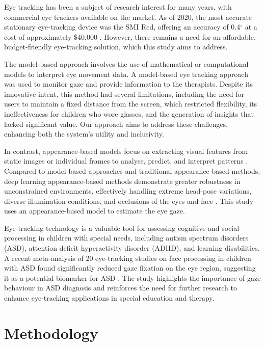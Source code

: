\documentclass[10pt,a4paper,twoside]{article}
\begin{document}
Eye tracking has been a subject of research interest for many years, with commercial eye trackers available on the market. As of 2020, the most accurate stationary eye-tracking device was the SMI Red, offering an accuracy of 0.4$^{\circ}$ at a cost of approximately \$40,000 \cite{rakhmatulin2020}. However, there remains a need for an affordable, budget-friendly eye-tracking solution, which this study aims to address.

The model-based approach \cite{Wang2015} involves the use of mathematical or computational models to interpret eye movement data. A model-based eye tracking approach \cite{Varghese2023} was used to monitor gaze and provide information to the therapists. Despite its innovative intent, this method had several limitations, including the need for users to maintain a fixed distance from the screen, which restricted flexibility, its ineffectiveness for children who wore glasses, and the generation of insights that lacked significant value. Our approach aims to address these challenges, enhancing both the system's utility and inclusivity.

In contrast, appearance-based models focus on extracting visual features from static images or individual frames to analyse, predict, and interpret patterns \cite{1182180}. Compared to model-based approaches and traditional appearance-based methods, deep learning appearance-based methods demonstrate greater robustness in unconstrained environments, effectively handling extreme head-pose variations, diverse illumination conditions, and occlusions of the eyes and face \cite{Pathirana2022}. This study uses an appearance-based model to estimate the eye gaze.

Eye-tracking technology is a valuable tool for assessing cognitive and social processing in children with special needs, including autism spectrum disorders (ASD), attention deficit hyperactivity disorder (ADHD), and learning disabilities. A recent meta-analysis of 20 eye-tracking studies on face processing in children with ASD found significantly reduced gaze fixation on the eye region, suggesting it as a potential biomarker for ASD \cite{Papagiannopoulou2014}. The study highlights the importance of gaze behaviour in ASD diagnosis and reinforces the need for further research to enhance eye-tracking applications in special education and therapy.

\section{Methodology}
\label{M}
\end{document}
